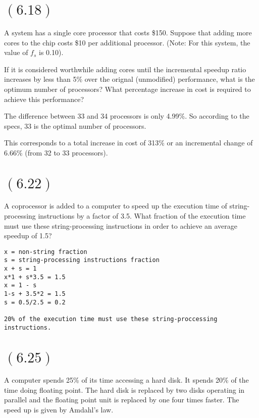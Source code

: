 \documentclass[letterpaper,12pt,titlepage]{article}
\begin{document}
\section*{$(6.18)$} A system has a single core processor that costs \$150. Suppose that adding more cores to the chip costs \$10 per additional processor. (Note: For this system, the value of $f_s$ is 0.10).

If it is considered worthwhile adding cores until the incremental speedup ratio increases by less than 5\% over the orignal (unmodified) performance, what is the optimum number of processors? What percentage increase in cost is required to achieve this performance?

\begin{mdframed}[style=MyFrame]
The difference between 33 and 34 processors is only 4.99\%.
So according to the specs, 33 is the optimal number of processors. 

This corresponds to a total increase in cost of 313\% or an incremental change of 6.66\% (from 32 to 33 processors).
\end{mdframed}

\section*{$(6.22)$} A coprocessor is added to a computer to speed up the execution time of string-processing instructions by a factor of 3.5. What fraction of the execution time must use these string-processing instructions in order to achieve an average speedup of 1.5?

\begin{mdframed}[style=MyFrame]
\begin{verbatim}
x = non-string fraction
s = string-processing instructions fraction
x + s = 1
x*1 + s*3.5 = 1.5
x = 1 - s
1-s + 3.5*2 = 1.5
s = 0.5/2.5 = 0.2

20% of the execution time must use these string-proccessing instructions.
\end{verbatim}
\end{mdframed}
\newpage
\section*{$(6.25)$} A computer spends 25\% of its time accessing a hard disk. It spends 20\% of the time doing floating point. The hard disk is replaced by two disks operating in parallel and the floating point unit is replaced by one four times faster. The speed up is given by Amdahl's law.
\end{document}
